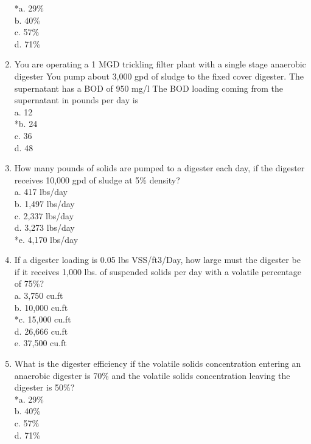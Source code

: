 \begin{enumerate}
*a. 29\% \\
b. 40\% \\
c. 57\% \\
d. 71\% \\

\item  You are operating a 1 MGD trickling filter plant with a single stage anaerobic digester You pump about 3,000 gpd of sludge to the fixed cover digester.  The supernatant has a BOD of 950 mg/l The BOD loading coming from the supernatant in pounds per day is \\

a. 12 \\
*b. 24 \\
c. 36 \\
d. 48 \\

\item  How many pounds of solids are pumped to a digester each day, if the digester receives 10,000 gpd of sludge at 5\% density? \\

a. 417 lbs/day \\
b. 1,497 lbs/day \\
c. 2,337 lbs/day \\
d. 3,273 lbs/day \\
*e. 4,170 lbs/day \\

\item  If a digester loading is 0.05 lbs VSS/ft3/Day, how large must the digester be if it receives 1,000 lbs. of suspended solids per day with a volatile percentage of 75\%? \\

a. 3,750 cu.ft \\
b. 10,000 cu.ft \\
*c. 15,000 cu.ft \\
d. 26,666 cu.ft \\
e. 37,500 cu.ft \\

\item  What is the digester efficiency if the volatile solids concentration entering an anaerobic digester is 70\% and the volatile solids concentration leaving the digester is 50\%? \\

*a. 29\% \\
b. 40\% \\
c. 57\% \\
d. 71\% \\


\end{enumerate}
